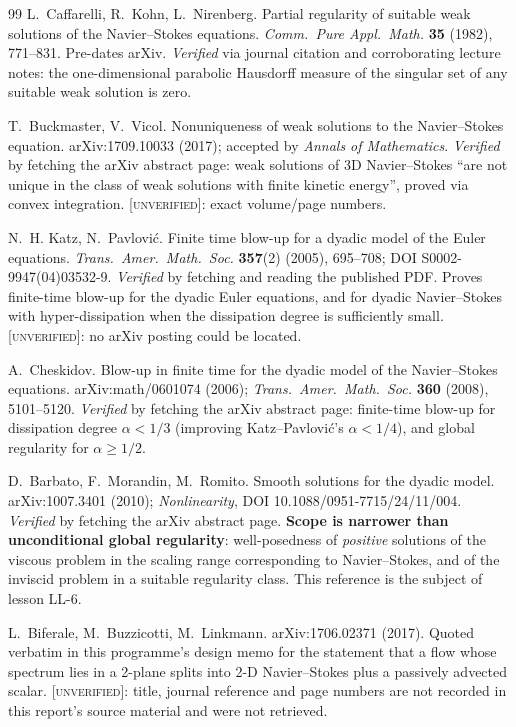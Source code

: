 \documentclass[11pt,a4paper]{article}
\theoremstyle{definition}
\theoremstyle{plain}
\begin{document}
\begin{thebibliography}{99}
L.~Caffarelli, R.~Kohn, L.~Nirenberg.
\newblock Partial regularity of suitable weak solutions of the Navier--Stokes equations.
\newblock \emph{Comm.\ Pure Appl.\ Math.} \textbf{35} (1982), 771--831. Pre-dates arXiv.
\newblock \emph{Verified} via journal citation and corroborating lecture notes: the
one-dimensional parabolic Hausdorff measure of the singular set of any suitable weak
solution is zero.

T.~Buckmaster, V.~Vicol.
\newblock Nonuniqueness of weak solutions to the Navier--Stokes equation.
\newblock arXiv:1709.10033 (2017); accepted by \emph{Annals of Mathematics}.
\newblock \emph{Verified} by fetching the arXiv abstract page: weak solutions of 3D
Navier--Stokes ``are not unique in the class of weak solutions with finite kinetic energy'',
proved via convex integration. \textsc{[unverified]}: exact volume/page numbers.

N.~H. Katz, N.~Pavlovi\'c.
\newblock Finite time blow-up for a dyadic model of the Euler equations.
\newblock \emph{Trans.\ Amer.\ Math.\ Soc.} \textbf{357}(2) (2005), 695--708;
DOI S0002-9947(04)03532-9.
\newblock \emph{Verified} by fetching and reading the published PDF. Proves finite-time
blow-up for the dyadic Euler equations, and for dyadic Navier--Stokes with hyper-dissipation
when the dissipation degree is sufficiently small. \textsc{[unverified]}: no arXiv posting
could be located.

A.~Cheskidov.
\newblock Blow-up in finite time for the dyadic model of the Navier--Stokes equations.
\newblock arXiv:math/0601074 (2006); \emph{Trans.\ Amer.\ Math.\ Soc.} \textbf{360} (2008),
5101--5120.
\newblock \emph{Verified} by fetching the arXiv abstract page: finite-time blow-up for
dissipation degree $\alpha<1/3$ (improving Katz--Pavlovi\'c's $\alpha<1/4$), and global
regularity for $\alpha\ge1/2$.

D.~Barbato, F.~Morandin, M.~Romito.
\newblock Smooth solutions for the dyadic model.
\newblock arXiv:1007.3401 (2010); \emph{Nonlinearity}, DOI 10.1088/0951-7715/24/11/004.
\newblock \emph{Verified} by fetching the arXiv abstract page. \textbf{Scope is narrower
than unconditional global regularity}: well-posedness of \emph{positive} solutions of the
viscous problem in the scaling range corresponding to Navier--Stokes, and of the inviscid
problem in a suitable regularity class. This reference is the subject of lesson LL-6.

L.~Biferale, M.~Buzzicotti, M.~Linkmann.
\newblock arXiv:1706.02371 (2017).
\newblock Quoted verbatim in this programme's design memo for the statement that a flow whose
spectrum lies in a 2-plane splits into 2-D Navier--Stokes plus a passively advected scalar.
\textsc{[unverified]}: title, journal reference and page numbers are not recorded in this
report's source material and were not retrieved.


\end{thebibliography}
\end{document}
